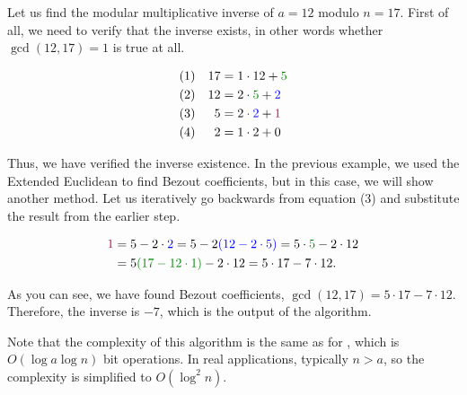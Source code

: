 \documentclass[../lecture-notes-148x210.tex]{subfiles}
\begin{document}
\begin{example}
    Let us find the modular multiplicative inverse of $a = 12$ modulo $n = 17$.
    First of all, we need to verify that the inverse exists, in other words
    whether $\gcd(12, 17) = 1$ is true at all.

    \begin{equation*}   
        \begin{aligned}
            (1) && 17 &= 1 \cdot 12 + \textcolor{green!50!black}{5} \\
            (2) && 12 &= 2 \cdot \textcolor{green!50!black}{5} + \textcolor{blue}{2} \\
            (3) && 5 &= 2 \cdot \textcolor{blue}{2} + \textcolor{purple}{1} \\
            (4) &&2 &= 1 \cdot 2 + 0
        \end{aligned}
    \end{equation*}

    Thus, we have verified the inverse existence. In the previous example, we
    used the Extended Euclidean  to find Bezout
    coefficients, but in this case, we will show another method. Let us
    iteratively go backwards from equation (3) and substitute the result from
    the earlier step.

    \begin{equation*}
        \begin{aligned}
            \textcolor{purple}{1} &= 5 - 2 \cdot \textcolor{blue}{2} = 5 - 2\textcolor{blue}{(12 - 2 \cdot 5)} = 5 \cdot \textcolor{green!50!black}{5} - 2 \cdot 12 \\
              &= 5\textcolor{green!50!black}{(17 - 12\cdot 1)} - 2 \cdot 12 = 5 \cdot 17 - 7 \cdot 12.
        \end{aligned}
    \end{equation*}

    As you can see, we have found Bezout coefficients, $\gcd(12, 17) = 5 \cdot 17 - 7 \cdot 12$.
    Therefore, the inverse is $-7$, which is the output of the algorithm.
\end{example}

\begin{remark}
    Note that the complexity of this algorithm is the same as for
    , which is $O(\log a \log n)$ bit operations. In real 
    applications, typically $n>a$, so the complexity is simplified to $O(\log^2 n)$.
\end{remark}
\end{document}

